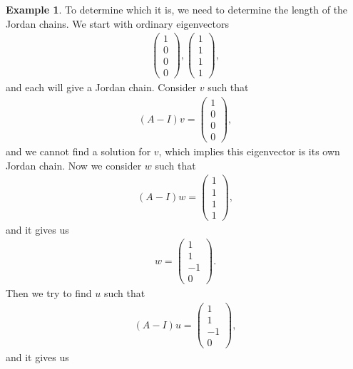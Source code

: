 \documentclass[10pt]{book}
\theoremstyle{definition}
\newtheorem{example}{Example}[chapter]
\numberwithin{equation}{chapter}
\begin{document}
\begin{example}
To determine which it is, we need to determine the length of the Jordan chains. We start with ordinary eigenvectors
\begin{align*}
    \begin{pmatrix}
    1 \\
    0 \\
    0 \\
    0
    \end{pmatrix}, \begin{pmatrix}
    1 \\
    1 \\
    1 \\
    1
    \end{pmatrix},
\end{align*}
and each will give a Jordan chain. Consider $v$ such that
\begin{align*}
    (A - I)v = \begin{pmatrix}
    1 \\
    0 \\
    0 \\
    0
    \end{pmatrix},
\end{align*}
and we cannot find a solution for $v$, which implies this eigenvector is its own Jordan chain. Now we consider $w$ such that
\begin{align*}
    (A - I)w = \begin{pmatrix}
    1 \\
    1 \\
    1 \\
    1
    \end{pmatrix},
\end{align*}
and it gives us 
\begin{align*}
    w = \begin{pmatrix}
    1 \\
    1 \\
    -1 \\
    0
    \end{pmatrix}.
\end{align*}
Then we try to find $u$ such that
\begin{align*}
    (A - I)u = \begin{pmatrix}
    1 \\
    1 \\
    -1 \\
    0
    \end{pmatrix},
\end{align*}
and it gives us
\begin{align*}

\end{align*}
\end{example}
\end{document}
